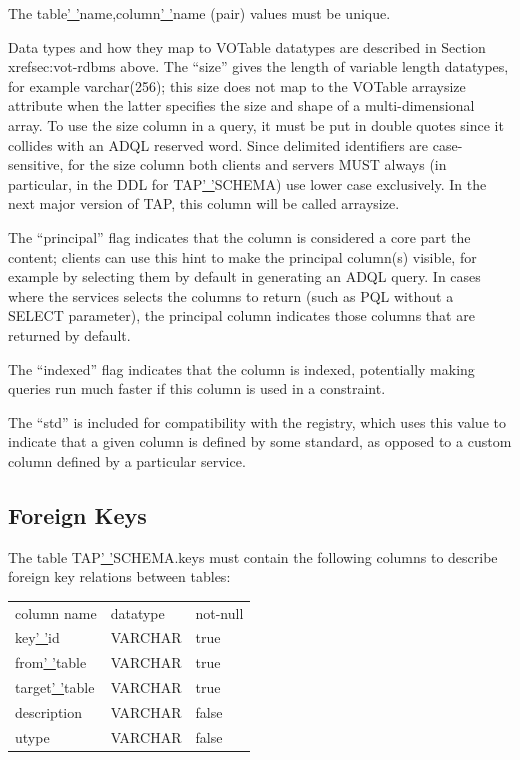 \documentclass[11pt,letter]{ivoa}
\begin{document}
{The table\underline{' '}name,column\underline{' '}name (pair) values must be 
unique.

Data types and how they map to VOTable datatypes are described in Section 
xref{sec:vot-rdbms} above. The “size” gives the length of variable length datatypes, 
for example varchar(256); this size does not map to the VOTable arraysize attribute 
when the latter specifies the size and shape of a multi-dimensional array. To use the 
size column in a query, it must be put in double quotes since it collides with an ADQL reserved 
word. Since delimited identifiers are case-sensitive, for the size column both 
clients and servers MUST always (in particular, in the DDL for 
TAP\underline{' '}SCHEMA) use lower case exclusively. In the next major version 
of TAP, this column will be called arraysize.

The “principal” flag indicates that the column is considered a core part the 
content; clients can use this hint to make the principal column(s) visible, for 
example by selecting them by default in generating an ADQL query. In cases where 
the services selects the columns to return (such as PQL without a SELECT 
parameter), the principal column indicates those columns that are returned by 
default. 

The “indexed” flag indicates that the column is indexed, potentially 
making queries run much faster if this column is used in a constraint. 

The “std” is included for compatibility with the registry, which uses this value 
to indicate that a given column is defined by some standard, as opposed to a 
custom column defined by a particular service.

\subsection{Foreign Keys}
\label{sec:tap-schema-keys}
The table TAP\underline{' '}SCHEMA.keys must contain the following columns to 
describe foreign key relations between tables:

\begin{tabular}{l l l}
\label{tab:tap-schema-keys}
column name & datatype & not-null \\
key\underline{' '}id & VARCHAR & true \\
from\underline{' '}table & VARCHAR & true \\
target\underline{' '}table & VARCHAR & true \\
description & VARCHAR & false \\
utype & VARCHAR & false \\
\end{tabular}

}
\end{document}
